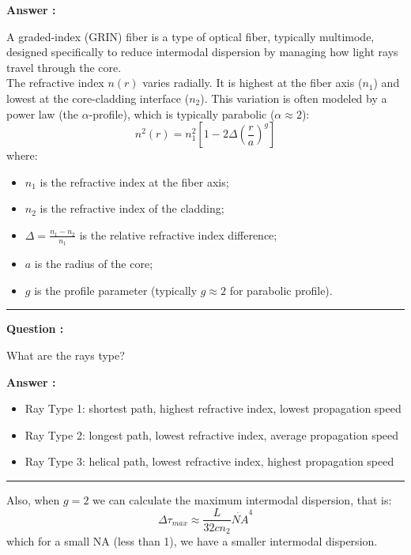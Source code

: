 \documentclass[a4paper,11pt]{book}
\newcounter{qacount}
\newenvironment{question}{
  \refstepcounter{qacount}
  \vspace{1em} %
  \noindent\textbf{Question \theqacount:}\space
}{
  \par %
}
\newenvironment{answer}{
  \noindent\textbf{Answer \theqacount:}\space
}{
  \par\vspace{1em}   %
  \hrule             %
  \vspace{0.5em}     %
}
\begin{document}
\begin{answer}
    A graded-index (GRIN) fiber is a type of optical fiber, typically multimode, designed specifically to reduce intermodal dispersion by managing how light rays travel through the core.\\
    The refractive index $n(r)$ varies radially. It is highest at the fiber axis ($n_1$) and lowest at the core-cladding interface ($n_2$). This variation is often modeled by a power law (the $\alpha$-profile), which is typically parabolic ($\alpha \approx 2$):
    $$
        n^{2}(r)=n_{1}^{2}\left[1-2 \Delta\left(\frac{r}{a}\right)^{g}\right]
    $$
    where:
    \begin{itemize}
        \item $n_1$ is the refractive index at the fiber axis;
        \item $n_2$ is the refractive index of the cladding;
        \item $\Delta = \frac{n_1 - n_2}{n_1}$ is the relative refractive index difference;
        \item $a$ is the radius of the core;
        \item $g$ is the profile parameter (typically $g \approx 2$ for parabolic profile).
    \end{itemize}
\end{answer}

\begin{question}
    What are the rays type?
\end{question}

\begin{answer}
    \begin{itemize}
        \item Ray Type 1: shortest path, highest refractive index, lowest propagation speed
        \item Ray Type 2: longest path, lowest refractive index, average propagation speed
        \item Ray Type 3: helical path, lowest refractive index, highest propagation speed
    \end{itemize}
\end{answer}

Also, when $g=2$ we can calculate the maximum intermodal dispersion, that is:
\begin{equation}
    \Delta \tau_{max} \approx \frac{L}{32 c n_2} \dot {NA}^4
\end{equation}
which for a small NA (less than 1), we have a smaller intermodal dispersion.
\end{document}
